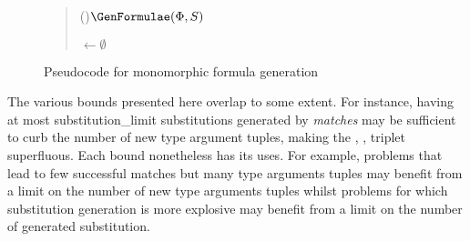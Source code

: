 \documentclass[]{ceurart}
\begin{document}
\begin{figure}
\begin{quote}
\begin{algorithm}[H]
\Fn(){\(\GenFormulae(\Phi, S)\)}{




   \BlankLine

   \NewFormulae \(\leftarrow\emptyset\)\;

   \BlankLine


   \BlankLine

   \Return \NewFormulae
}
\end{algorithm}
\end{quote}
\caption{Pseudocode for monomorphic formula generation}
\label{gen_formulae}
\end{figure}


The various bounds presented here overlap to some extent. For instance, having at most \textcolor{ourblueviolet}{substitution\_limit} substitutions generated by \emph{matches} may be sufficient to curb the number of new type argument tuples, making the \textcolor{ourblueviolet}{\MonoCap}, \textcolor{ourblueviolet}{\MonoMult}, \textcolor{ourblueviolet}{\MonoFloor} triplet superfluous. Each bound nonetheless has its uses. For example, problems that lead to few successful matches but many type arguments tuples may benefit from a limit on the number of new type arguments tuples whilst problems for which substitution generation is more explosive may benefit from a limit on the number of generated substitution.
\end{document}
